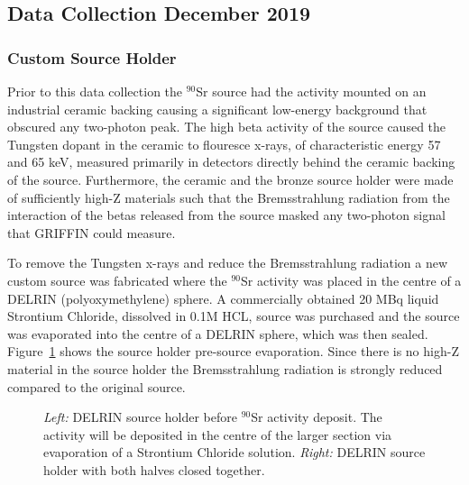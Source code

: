 \documentclass[cnatzke_thesis_proposal.tex]{subfiles}
\begin{document}
\subsection{Data Collection December 2019}
\subsubsection{Custom Source Holder}

Prior to this data collection the $^{90}$Sr source had the activity mounted on an industrial ceramic backing causing a significant low-energy background that obscured any two-photon peak. 
The high beta activity of the source caused the Tungsten dopant in the ceramic to flouresce x-rays, of characteristic energy 57 and 65 keV, measured primarily in detectors directly behind the ceramic backing of the source. 
Furthermore, the ceramic and the bronze source holder were made of sufficiently high-Z materials such that the Bremsstrahlung radiation from the interaction of the betas released from the source masked any two-photon signal that GRIFFIN could measure. 

To remove the Tungsten x-rays and reduce the Bremsstrahlung radiation a new custom source was fabricated where the $^{90}$Sr activity was placed in the centre of a DELRIN (polyoxymethylene) sphere. 
A commercially obtained 20 MBq liquid Strontium Chloride, dissolved in 0.1M HCL, source was purchased and the source was evaporated into the centre of a DELRIN sphere, which was then sealed. 
Figure~\ref{fig:source_holder} shows the source holder pre-source evaporation. 
Since there is no high-Z material in the source holder the Bremsstrahlung radiation is strongly reduced compared to the original source. 


\begin{figure}[htbp]
  \centering
  \qquad
  \caption{
    \textit{Left:} DELRIN source holder before $^{90}$Sr activity deposit. The activity will be deposited in the centre of the larger section via evaporation of a Strontium Chloride solution. 
    \textit{Right:} DELRIN source holder with both halves closed together.
  }
  \label{fig:source_holder}
\end{figure}
\end{document}
